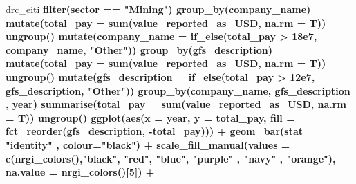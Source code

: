 \documentclass[]{article}
\newenvironment{Shaded}{\begin{snugshade}}{\end{snugshade}}
\newcommand{\DataTypeTok}[1]{\textcolor[rgb]{0.13,0.29,0.53}{#1}}
\newcommand{\DecValTok}[1]{\textcolor[rgb]{0.00,0.00,0.81}{#1}}
\newcommand{\FloatTok}[1]{\textcolor[rgb]{0.00,0.00,0.81}{#1}}
\newcommand{\KeywordTok}[1]{\textcolor[rgb]{0.13,0.29,0.53}{\textbf{#1}}}
\newcommand{\NormalTok}[1]{#1}
\newcommand{\OperatorTok}[1]{\textcolor[rgb]{0.81,0.36,0.00}{\textbf{#1}}}
\newcommand{\StringTok}[1]{\textcolor[rgb]{0.31,0.60,0.02}{#1}}
\begin{document}
\begin{Shaded}
\begin{Highlighting}[]
\NormalTok{drc_eiti }\OperatorTok{%>%}\StringTok{ }
\StringTok{  }\KeywordTok{filter}\NormalTok{(sector }\OperatorTok{==}\StringTok{ "Mining"}\NormalTok{) }\OperatorTok{%>%}\StringTok{ }
\StringTok{  }\KeywordTok{group_by}\NormalTok{(company_name) }\OperatorTok{%>%}\StringTok{ }
\StringTok{  }\KeywordTok{mutate}\NormalTok{(}\DataTypeTok{total_pay =} \KeywordTok{sum}\NormalTok{(value_reported_as_USD, }\DataTypeTok{na.rm =}\NormalTok{ T)) }\OperatorTok{%>%}\StringTok{ }
\StringTok{  }\KeywordTok{ungroup}\NormalTok{() }\OperatorTok{%>%}\StringTok{ }
\StringTok{  }\KeywordTok{mutate}\NormalTok{(}\DataTypeTok{company_name =} \KeywordTok{if_else}\NormalTok{(total_pay }\OperatorTok{>}\StringTok{ }\FloatTok{18e7}\NormalTok{, company_name, }\StringTok{"Other"}\NormalTok{)) }\OperatorTok{%>%}\StringTok{ }
\StringTok{  }\KeywordTok{group_by}\NormalTok{(gfs_description) }\OperatorTok{%>%}\StringTok{ }
\StringTok{  }\KeywordTok{mutate}\NormalTok{(}\DataTypeTok{total_pay =} \KeywordTok{sum}\NormalTok{(value_reported_as_USD, }\DataTypeTok{na.rm =}\NormalTok{ T)) }\OperatorTok{%>%}\StringTok{ }
\StringTok{  }\KeywordTok{ungroup}\NormalTok{() }\OperatorTok{%>%}\StringTok{ }
\StringTok{  }\KeywordTok{mutate}\NormalTok{(}\DataTypeTok{gfs_description =} \KeywordTok{if_else}\NormalTok{(total_pay }\OperatorTok{>}\StringTok{ }\FloatTok{12e7}\NormalTok{, gfs_description, }\StringTok{"Other"}\NormalTok{)) }\OperatorTok{%>%}\StringTok{ }
\StringTok{  }\KeywordTok{group_by}\NormalTok{(company_name, gfs_description , year) }\OperatorTok{%>%}\StringTok{ }
\StringTok{  }\KeywordTok{summarise}\NormalTok{(}\DataTypeTok{total_pay =} \KeywordTok{sum}\NormalTok{(value_reported_as_USD, }\DataTypeTok{na.rm =}\NormalTok{ T)) }\OperatorTok{%>%}\StringTok{ }
\StringTok{  }\KeywordTok{ungroup}\NormalTok{() }\OperatorTok{%>%}\StringTok{ }
\StringTok{  }\KeywordTok{ggplot}\NormalTok{(}\KeywordTok{aes}\NormalTok{(}\DataTypeTok{x =}\NormalTok{ year, }\DataTypeTok{y =}\NormalTok{ total_pay, }\DataTypeTok{fill =} \KeywordTok{fct_reorder}\NormalTok{(gfs_description, }\OperatorTok{-}\NormalTok{total_pay))) }\OperatorTok{+}
\StringTok{  }\KeywordTok{geom_bar}\NormalTok{(}\DataTypeTok{stat =} \StringTok{"identity"}\NormalTok{ , }\DataTypeTok{colour=}\StringTok{"black"}\NormalTok{) }\OperatorTok{+}
\StringTok{  }\KeywordTok{scale_fill_manual}\NormalTok{(}\DataTypeTok{values =} \KeywordTok{c}\NormalTok{(}\KeywordTok{nrgi_colors}\NormalTok{(),}\StringTok{"black"}\NormalTok{, }\StringTok{"red"}\NormalTok{, }\StringTok{"blue"}\NormalTok{, }\StringTok{"purple"}\NormalTok{ , }\StringTok{"navy"}\NormalTok{ , }\StringTok{"orange"}\NormalTok{), }\DataTypeTok{na.value =} \KeywordTok{nrgi_colors}\NormalTok{()[}\DecValTok{5}\NormalTok{]) }\OperatorTok{+}
}}}}}}}}}}}}}
\end{Highlighting}
\end{Shaded}
\end{document}
